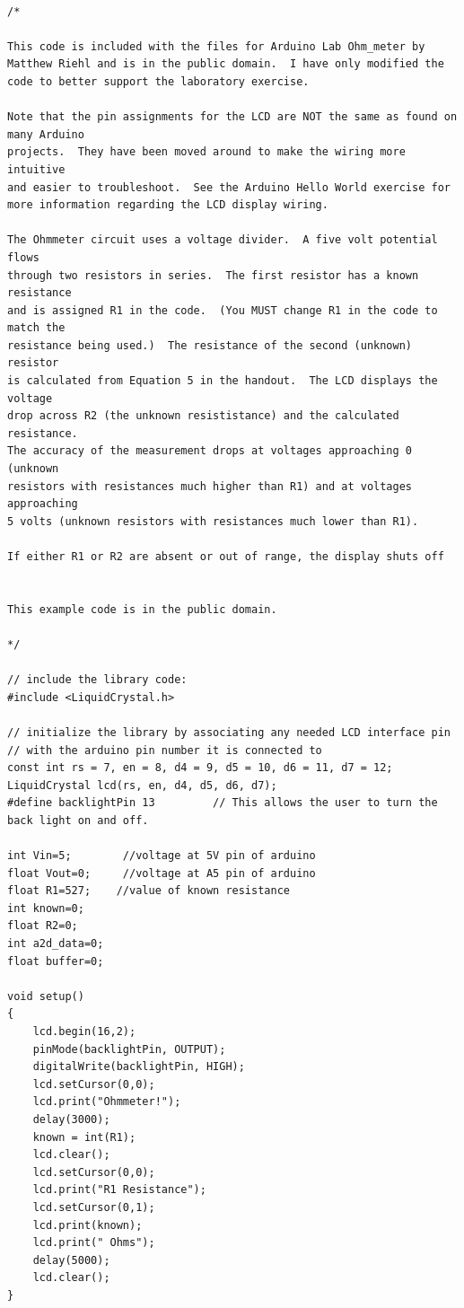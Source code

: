 \documentclass[]{article}
\begin{document}
\begin{verbatim}

/*

This code is included with the files for Arduino Lab Ohm_meter by 
Matthew Riehl and is in the public domain.  I have only modified the
code to better support the laboratory exercise.

Note that the pin assignments for the LCD are NOT the same as found on many Arduino 
projects.  They have been moved around to make the wiring more intuitive 
and easier to troubleshoot.  See the Arduino Hello World exercise for 
more information regarding the LCD display wiring.

The Ohmmeter circuit uses a voltage divider.  A five volt potential flows
through two resistors in series.  The first resistor has a known resistance
and is assigned R1 in the code.  (You MUST change R1 in the code to match the 
resistance being used.)  The resistance of the second (unknown) resistor
is calculated from Equation 5 in the handout.  The LCD displays the voltage
drop across R2 (the unknown resististance) and the calculated resistance.  
The accuracy of the measurement drops at voltages approaching 0 (unknown
resistors with resistances much higher than R1) and at voltages approaching
5 volts (unknown resistors with resistances much lower than R1).

If either R1 or R2 are absent or out of range, the display shuts off


This example code is in the public domain.

*/

// include the library code:
#include <LiquidCrystal.h>

// initialize the library by associating any needed LCD interface pin
// with the arduino pin number it is connected to
const int rs = 7, en = 8, d4 = 9, d5 = 10, d6 = 11, d7 = 12;
LiquidCrystal lcd(rs, en, d4, d5, d6, d7);
#define backlightPin 13         // This allows the user to turn the back light on and off.

int Vin=5;        //voltage at 5V pin of arduino
float Vout=0;     //voltage at A5 pin of arduino
float R1=527;    //value of known resistance
int known=0;
float R2=0;
int a2d_data=0;    
float buffer=0;

void setup() 
{
	lcd.begin(16,2);
	pinMode(backlightPin, OUTPUT);
	digitalWrite(backlightPin, HIGH);
	lcd.setCursor(0,0);
	lcd.print("Ohmmeter!");
	delay(3000);
	known = int(R1);
	lcd.clear();
	lcd.setCursor(0,0);
	lcd.print("R1 Resistance");
	lcd.setCursor(0,1);
	lcd.print(known);
	lcd.print(" Ohms");
	delay(5000);
	lcd.clear();
}


\end{verbatim}
\end{document}
